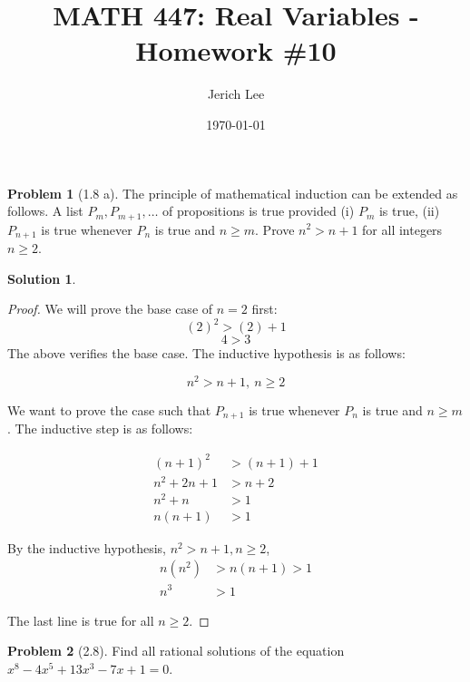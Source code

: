 \documentclass[12pt]{article}
\title{MATH 447: Real Variables - Homework \#10}
\author{Jerich Lee}
\date{\today}
\theoremstyle{definition} %
\newtheorem{solution}{Solution}
\newtheorem{problem}{Problem}
\theoremstyle{plain} %
\begin{document}
\maketitle

\begin{problem}[1.8 a]
The principle of mathematical induction can be extended as follows. A list $P_{m}, P_{m+1}, \dots$ of propositions is true provided (i) $P_{m}$ is true, (ii) $P_{n+1}$ is true whenever $P_{n}$ is true and $n\geq m$.
Prove $n^2>n+1$ for all integers $n\geq2$.
\end{problem}

\begin{solution}
\begin{proof}
    We will prove the base case of $n=2$ first:
$$
(2)^2>(2)+1
$$
$$
4>3
$$
The above verifies the base case. The inductive hypothesis is as follows:

$$
n^2>n+1, \ n\geq 2
$$

We want to prove the case such that $P_{n+1}$ is true whenever $P_{n}$ is true and $n\geq m$. The inductive step is as follows:

\begin{align}
(n+1)^2 &> (n+1)+1 \\
n^2+2n+1 &> n+2 \\
n^2+n &> 1 \\
n(n+1) &> 1
\end{align}

By the inductive hypothesis, $n^2>n+1, n\geq 2$,
\begin{align}
n(n^2) &> n(n+1) > 1 \\
n^3 &> 1
\end{align}

The last line is true for all $n\geq 2$.  
\end{proof}

\end{solution}
\begin{problem}[2.8]
    Find all rational solutions of the equation $x^8-4x^5+13x^3-7x+1=0$.
\end{problem}
\end{document}
